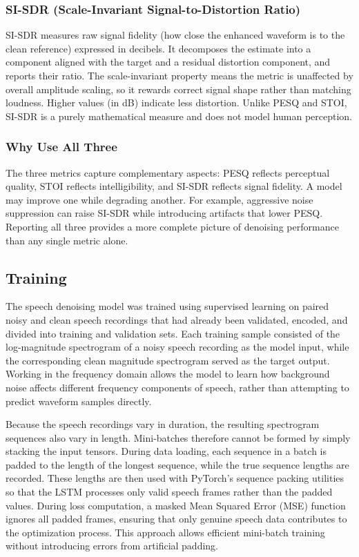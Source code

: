 \documentclass[11pt, letterpaper,titlepage]{article}
\begin{document}
\subsubsection*{SI-SDR (Scale-Invariant Signal-to-Distortion Ratio)}
SI-SDR measures raw signal fidelity (how close the enhanced
waveform is to the clean reference) expressed in decibels. It
decomposes the estimate into a component aligned with the target and a
residual distortion component, and reports their ratio. The
scale-invariant property means the metric is unaffected by overall
amplitude scaling, so it rewards correct signal shape rather
than matching loudness. Higher values (in dB) indicate less
distortion. Unlike PESQ and STOI, SI-SDR is a purely mathematical
measure and does not model human perception.

\subsubsection{Why Use All Three}
The three metrics capture complementary aspects: PESQ reflects
perceptual quality, STOI reflects intelligibility, and SI-SDR reflects
signal fidelity. A model may improve one while degrading another. For
example, aggressive noise suppression can raise SI-SDR while
introducing artifacts that lower PESQ. Reporting all three provides a
more complete picture of denoising performance than any single metric
alone.

\subsection{Training}


The speech denoising model was trained using supervised learning on paired noisy and clean speech recordings that had already been validated, encoded, and divided into training and validation sets. Each training sample consisted of the log-magnitude spectrogram of a noisy speech recording as the model input, while the corresponding clean magnitude spectrogram served as the target output. Working in the frequency domain allows the model to learn how background noise affects different frequency components of speech, rather than attempting to predict waveform samples directly.

Because the speech recordings vary in duration, the resulting spectrogram sequences also vary in length. Mini-batches therefore cannot be formed by simply stacking the input tensors. During data loading, each sequence in a batch is padded to the length of the longest sequence, while the true sequence lengths are recorded. These lengths are then used with PyTorch's sequence packing utilities so that the LSTM processes only valid speech frames rather than the padded values. During loss computation, a masked Mean Squared Error (MSE) function ignores all padded frames, ensuring that only genuine speech data contributes to the optimization process. This approach allows efficient mini-batch training without introducing errors from artificial padding.
\end{document}
